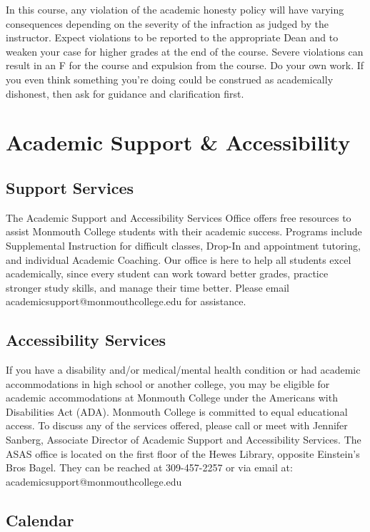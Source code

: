 \documentclass[10pt]{article}
\begin{document}
In this course, any violation of the academic honesty policy will have varying consequences depending on the severity of the infraction as judged by the instructor.  Expect violations to be reported to the appropriate Dean and to weaken your case for higher grades at the end of the course. Severe violations can result in an F for the course and expulsion from the course. Do your own work. If you even think something you're doing could be construed as academically dishonest, then ask for guidance and clarification first.


\section{Academic Support \& Accessibility}

\subsection*{Support Services}
The Academic Support and Accessibility Services Office offers free resources to assist Monmouth College students with their academic success. Programs include Supplemental Instruction for difficult classes, Drop-In and appointment tutoring, and individual Academic Coaching. Our office is here to help all students excel academically, since every student can work toward better grades, practice stronger study skills, and manage their time better. Please email academicsupport@monmouthcollege.edu for assistance.

\subsection*{Accessibility Services}
If you have a disability and/or medical/mental health condition or had academic accommodations in high school or another college, you may be eligible for academic accommodations at Monmouth College under the Americans with Disabilities Act (ADA). Monmouth College is committed to equal educational access. To discuss any of the services offered, please call or meet with Jennifer Sanberg, Associate Director of Academic Support and Accessibility Services. The ASAS office is located on the first floor of the Hewes Library, opposite Einstein’s Bros Bagel. They can be reached at 309-457-2257 or via email at: academicsupport@monmouthcollege.edu

\subsection{Calendar}
\end{document}
